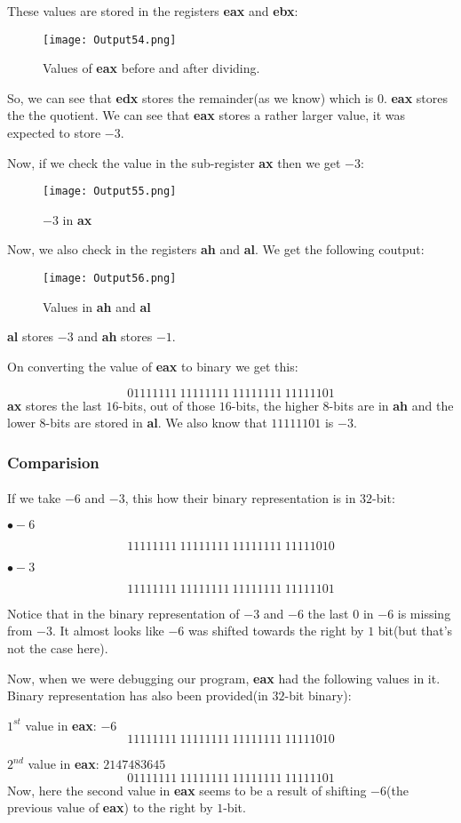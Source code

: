\documentclass{article}
\begin{document}
These values are stored in the registers \textbf{eax} and \textbf{ebx}:
\begin{figure}[h]
\centering
\texttt{[image: Output54.png]}
\caption{Values of \textbf{eax} before and after dividing.}
\label{fig:fig2}
\end{figure}

So, we can see that \textbf{edx} stores the remainder(as we know) which is $0$. \textbf{eax} stores the the quotient. We can see that \textbf{eax} stores a rather larger value, it was expected to store $-3$.

Now, if we check the value in the sub-register \textbf{ax} then we get $-3$:
\begin{figure}[h]
\centering
\texttt{[image: Output55.png]}
\caption{$-3$ in \textbf{ax}}
\label{fig:fig3}
\end{figure}

\newpage
Now, we also check in the registers \textbf{ah} and \textbf{al}. We get the following coutput:
\begin{figure}[h]
\centering
\texttt{[image: Output56.png]}
\caption{Values in \textbf{ah} and \textbf{al}}
\label{fig:fig4}
\end{figure}

\textbf{al} stores $-3$ and \textbf{ah} stores $-1$.

On converting the value of \textbf{eax} to binary we get this:

$$
01111111\ 11111111\ 11111111\ 11111101
$$
\textbf{ax} stores the last $16$-bits, out of those $16$-bits, the higher $8$-bits are in \textbf{ah} and the lower $8$-bits are stored in \textbf{al}. We also know that $11111101$ is $-3$.

\subsubsection{Comparision}\label{sec:subsubsec1}
\paragraph{}
If we take $-6$ and $-3$, this how their binary representation is in $32$-bit:

$\bullet -6$

$$
11111111\ 11111111\ 11111111\ 11111010
$$

$\bullet -3$

$$
11111111\ 11111111\ 11111111\ 11111101
$$

Notice that in the binary representation of $-3$ and $-6$ the last $0$ in $-6$ is missing from $-3$. It almost looks like $-6$ was shifted towards the right by $1$ bit(but that's not the case here).

Now, when we were debugging our program, \textbf{eax} had the following values in it. Binary representation has also been provided(in $32$-bit binary):

$1^{st}$ value in \textbf{eax}: $-6$
$$
11111111\ 11111111\ 11111111\ 11111010
$$

$2^{nd}$ value in \textbf{eax}: $2147483645$
$$
01111111\ 11111111\ 11111111\ 11111101
$$
Now, here the second value in \textbf{eax} seems to be a result of shifting $-6$(the previous value of \textbf{eax}) to the right by $1$-bit.
\end{document}
